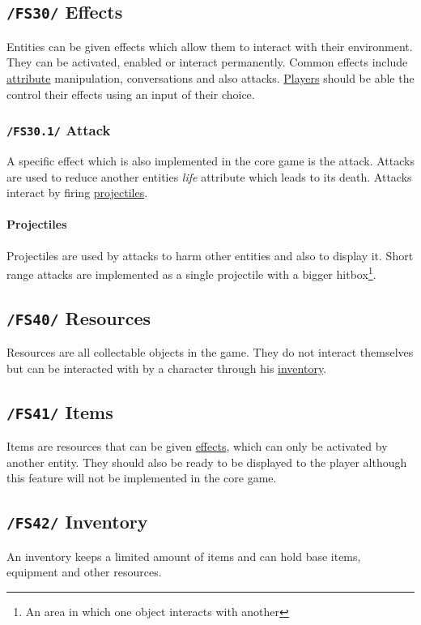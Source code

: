 \documentclass[11pt]{article}
\begin{document}
\subsection{\texttt{/FS30/} Effects}\label{subsec:fs30effects}
Entities can be given effects which allow them to interact with their environment.
They can be activated, enabled or interact permanently. Common effects include \hyperref[subsec:fs50attributes]{attribute} manipulation, conversations and also attacks.
\hyperref[subsec:fs60player]{Players} should be able the control their effects using an input of their choice.
\subsubsection{\texttt{/FS30.1/} Attack}
A specific effect which is also implemented in the core game is the attack. Attacks are used to reduce another entities \textit{life} attribute which leads to its death.
Attacks interact by firing \hyperref[par:projectiles]{projectiles}.
\paragraph{Projectiles}\label{par:projectiles}
Projectiles are used by attacks to harm other entities and also to display it. Short range attacks are implemented as a single projectile with a bigger hitbox\footnote{An area in which one object interacts with another}.
\subsection{\texttt{/FS40/} Resources}\label{subsec:fs40resources}
Resources are all collectable objects in the game. They do not interact themselves but can be interacted with by a character through his \hyperref[subsec:fs42inventory]{inventory}.
\subsection{\texttt{/FS41/} Items}\label{subsec:fs41items}
Items are resources that can be given \hyperref[subsec:fs30effects]{effects}, which can only be activated by another entity. 
They should also be ready to be displayed to the player although this feature will not be implemented in the core game.
\subsection{\texttt{/FS42/} Inventory}\label{subsec:fs42inventory}
An inventory keeps a limited amount of items and can hold base items, equipment and other resources.
\end{document}
